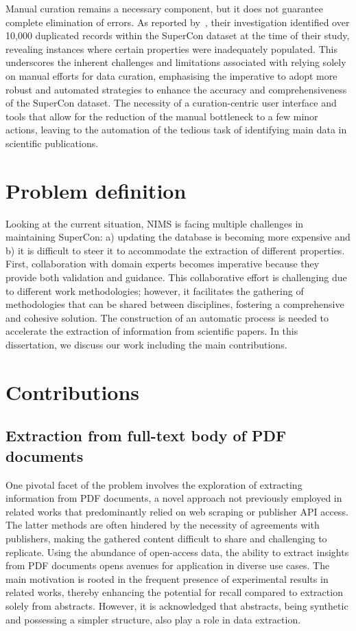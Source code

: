 Manual curation remains a necessary component, but it does not guarantee complete elimination of errors. As reported by~\cite{sommer20223dsc}, their investigation identified over 10,000 duplicated records within the SuperCon dataset at the time of their study, revealing instances where certain properties were inadequately populated. 
This underscores the inherent challenges and limitations associated with relying solely on manual efforts for data curation, emphasising the imperative to adopt more robust and automated strategies to enhance the accuracy and comprehensiveness of the SuperCon dataset.
The necessity of a curation-centric user interface and tools that allow for the reduction of the manual bottleneck to a few minor actions, leaving to the automation of the tedious task of identifying main data in scientific publications.


\section{Problem definition}

Looking at the current situation, NIMS is facing multiple challenges in maintaining SuperCon: a) updating the database is becoming more expensive and b) it is difficult to steer it to accommodate the extraction of different properties. 
First, collaboration with domain experts becomes imperative because they provide both validation and guidance. 
This collaborative effort is challenging due to different work methodologies; however, it facilitates the gathering of methodologies that can be shared between disciplines, fostering a comprehensive and cohesive solution.
The construction of an automatic process is needed to accelerate the extraction of information from scientific papers. In this dissertation, we discuss our work including the main contributions. 

\section{Contributions}

\subsection{Extraction from full-text body of PDF documents}
One pivotal facet of the problem involves the exploration of extracting information from PDF documents, a novel approach not previously employed in related works that predominantly relied on web scraping or publisher API access. 
The latter methods are often hindered by the necessity of agreements with publishers, making the gathered content difficult to share and challenging to replicate.
Using the abundance of open-access data, the ability to extract insights from PDF documents opens avenues for application in diverse use cases. 
The main motivation is rooted in the frequent presence of experimental results in related works, thereby enhancing the potential for recall compared to extraction solely from abstracts. 
However, it is acknowledged that abstracts, being synthetic and possessing a simpler structure, also play a role in data extraction.


